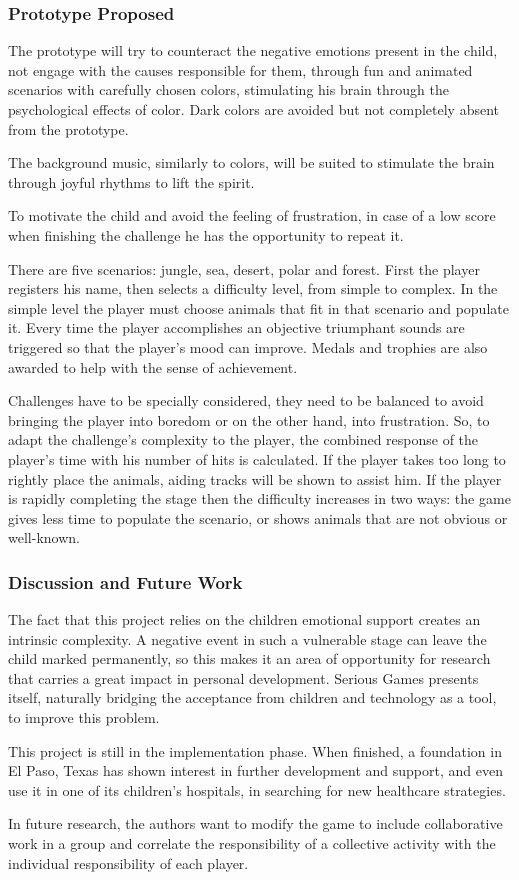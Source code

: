 \documentclass[runningheads]{llncs}
\begin{document}
\subsubsection{Prototype Proposed}
\par The prototype will try to counteract the negative emotions present in the child, not engage with the causes responsible for them, through fun and animated scenarios with carefully chosen colors, stimulating his brain through the psychological effects of color. Dark colors are avoided but not completely absent from the prototype.
\par The background music, similarly to colors, will be suited to stimulate the brain through joyful rhythms to lift the spirit.
\par To motivate the child and avoid the feeling of frustration, in case of a low score when finishing the challenge he has the opportunity to repeat it. 
\par There are five scenarios: jungle, sea, desert, polar and forest. First the player registers his name, then selects a difficulty level, from simple to complex. In the simple level the player must choose animals that fit in that scenario and populate it. Every time the player accomplishes an objective triumphant sounds are triggered so that the player's mood can improve. Medals and trophies are also awarded to help with the sense of achievement.
\par Challenges have to be specially considered, they need to be balanced to avoid bringing the player into boredom or on the other hand, into frustration. So, to adapt the challenge's complexity to the player, the combined response of the player's time with his number of hits is calculated. If the player takes too long to rightly place the animals, aiding tracks will be shown to assist him. If the player is rapidly completing the stage then the difficulty increases in two ways: the game gives less time to populate the scenario, or shows animals that are not obvious or well-known.

\subsubsection{Discussion and Future Work}
\par The fact that this project relies on the children emotional support creates an intrinsic complexity. A negative event in such a vulnerable stage can leave the child marked permanently, so this makes it an area of opportunity for research that carries a great impact in personal development. Serious Games presents itself, naturally bridging the acceptance from children and technology as a tool, to improve this problem.
\par This project is still in the implementation phase. When finished, a foundation in El Paso, Texas has shown interest in further development and support, and even use it in one of its children's hospitals, in searching for new healthcare strategies.
\par In future research, the authors want to modify the game to include collaborative work in a group and correlate the responsibility of a collective activity with the individual responsibility of each player.
\end{document}
